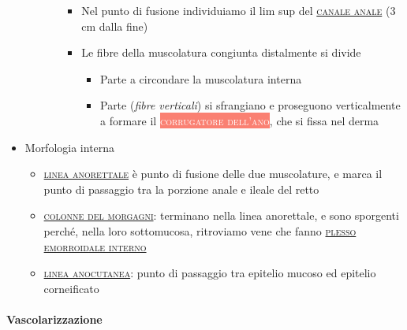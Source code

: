 \documentclass[italian,]{article}
\providecommand{\tightlist}{%
  \setlength{\itemsep}{0pt}\setlength{\parskip}{0pt}}
\newcommand{\mus}[1]{\colorbox{Salmon}{\textcolor{white}{\textsc{#1}}}}
\renewcommand{\a}[1]{\underline{\textsc{#1}}}
\begin{document}
\begin{itemize}
\begin{itemize}
\begin{itemize}
      \begin{itemize}
      \tightlist
      \item
        Nel punto di fusione individuiamo il lim sup del
        \a{canale anale} (3 cm dalla fine)
      \item
        Le fibre della muscolatura congiunta distalmente si divide

        \begin{itemize}
        \tightlist
        \item
          Parte a circondare la muscolatura interna
        \item
          Parte (\emph{fibre verticali}) si sfrangiano e proseguono
          verticalmente a formare il \mus{corrugatore dell'ano}, che si
          fissa nel derma
        \end{itemize}
      \end{itemize}
    \end{itemize}
  \end{itemize}
\item
  Morfologia interna

  \begin{itemize}
  \tightlist
  \item
    \a{linea anorettale} è punto di fusione delle due muscolature, e
    marca il punto di passaggio tra la porzione anale e ileale del retto
  \item
    \a{colonne del morgagni}: terminano nella linea anorettale, e sono
    sporgenti perché, nella loro sottomucosa, ritroviamo vene che fanno
    \a{plesso emorroidale interno}
  \item
    \a{linea anocutanea}: punto di passaggio tra epitelio mucoso ed
    epitelio corneificato
  \end{itemize}
\end{itemize}

\hypertarget{vascolarizzazione-5}{%
\paragraph{Vascolarizzazione}\label{vascolarizzazione-5}}
\end{document}
